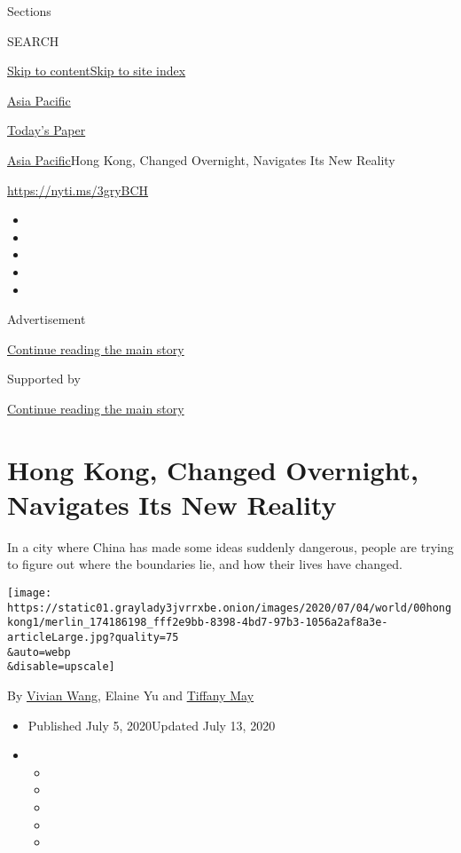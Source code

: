 Sections

SEARCH

\protect\hyperlink{site-content}{Skip to
content}\protect\hyperlink{site-index}{Skip to site index}

\href{https://www.nytimes3xbfgragh.onion/section/world/asia}{Asia
Pacific}

\href{https://myaccount.nytimes3xbfgragh.onion/auth/login?response_type=cookie\&client_id=vi}{}

\href{https://www.nytimes3xbfgragh.onion/section/todayspaper}{Today's
Paper}

\href{/section/world/asia}{Asia Pacific}\textbar{}Hong Kong, Changed
Overnight, Navigates Its New Reality

\url{https://nyti.ms/3gryBCH}

\begin{itemize}
\item
\item
\item
\item
\item
\end{itemize}

Advertisement

\protect\hyperlink{after-top}{Continue reading the main story}

Supported by

\protect\hyperlink{after-sponsor}{Continue reading the main story}

\hypertarget{hong-kong-changed-overnight-navigates-its-new-reality}{%
\section{Hong Kong, Changed Overnight, Navigates Its New
Reality}\label{hong-kong-changed-overnight-navigates-its-new-reality}}

In a city where China has made some ideas suddenly dangerous, people are
trying to figure out where the boundaries lie, and how their lives have
changed.

\texttt{[image: https://static01.graylady3jvrrxbe.onion/images/2020/07/04/world/00hongkong1/merlin\_174186198\_fff2e9bb-8398-4bd7-97b3-1056a2af8a3e-articleLarge.jpg?quality=75\\\&auto=webp\\\&disable=upscale]}

By \href{https://www.nytimes3xbfgragh.onion/by/vivian-wang}{Vivian
Wang}, Elaine Yu and
\href{https://www.nytimes3xbfgragh.onion/by/tiffany-may}{Tiffany May}

\begin{itemize}
\item
  Published July 5, 2020Updated July 13, 2020
\item
  \begin{itemize}
  \item
  \item
  \item
  \item
  \item
  \end{itemize}
\end{itemize}

